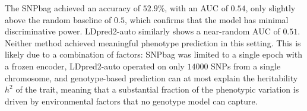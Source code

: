 The SNPbag achieved an accuracy of $52.9\%$, with an AUC of $0.54$, only slightly above the random baseline of $0.5$, which confirms that the model has minimal discriminative power. LDpred2-auto similarly shows a near-random AUC of $0.51$. Neither method achieved meaningful phenotype prediction in this setting. This is likely due to a combination of factors: SNPbag was limited to a single epoch with a frozen encoder, LDpred2-auto operated on only $14000$ SNPs from a single chromosome, and genotype-based prediction can at most explain the heritability $h^2$ of the trait, meaning that a substantial fraction of the phenotypic variation is driven by environmental factors that no genotype model can capture.